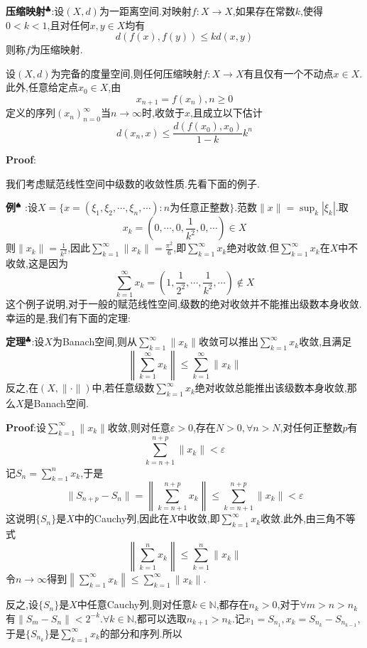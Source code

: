 \textbf{压缩映射}$^\clubsuit $:设$(X,d)$为一距离空间.对映射$f:X\to X$,如果存在常数$k$,使得$0<k<1$,且对任何$x,y\in X$均有
$$
d(f(x),f(y))\leqslant kd(x,y)
$$
则称$f$为压缩映射.
\begin{tcolorbox}[colback=KuangNei,colframe=BianKuang,title=\textbf{Banach不动点定理},sharpish corners]
    设$(X,d)$为完备的度量空间,则任何压缩映射$f:X\to X$有且仅有一个不动点$x\in X$.\\
    此外,任意给定点$x_0\in X$,由
    $$
    x_{n+1}=f(x_n),n\geqslant 0
    $$
    定义的序列$(x_n)^{\infty}_{n=0}$当$n\to \infty$时,收敛于$x$,且成立以下估计
    $$
    d(x_n,x)\leqslant \frac{d(f(x_0),x_0)}{1-k}k^n
    $$
\end{tcolorbox}
\textbf{Proof}:\quad \par
我们考虑赋范线性空间中级数的收敛性质.先看下面的例子.\par
\textbf{例}$^\spadesuit$ :设$X=\{x=(\xi_1,\xi_2,\cdots,\xi_n,\cdots):n\text{为任意正整数}\}$.范数$\|x\|=\sup_{k}|\xi_k|$.取
$$
x_k=(0,\cdots,0,\frac{1}{k^2},0,\cdots)\in X
$$
则$\|x_k\|=\frac{1}{k^2}$,因此$\sum_{k=1}^{\infty}\|x_k\|=\frac{\pi^2}{6}$,即$\sum_{k=1}^{\infty}x_k$绝对收敛.但$\sum_{k=1}^{\infty}x_k$在$X$中不收敛,这是因为
$$
\sum_{k=1}^{\infty}x_k=\left(1,\frac{1}{2^2},\cdots,\frac{1}{k^2},\cdots\right)\notin X
$$
这个例子说明,对于一般的赋范线性空间,级数的绝对收敛并不能推出级数本身收敛.幸运的是,我们有下面的定理:\par
\textbf{定理}$^\clubsuit $:设$X$为Banach空间,则从$\sum_{k=1}^{\infty}\|x_k\|$收敛可以推出$\sum_{k=1}^{\infty}x_k$收敛,且满足
$$
\left\|\sum_{k=1}^{\infty}x_k\right\|\leqslant \sum_{k=1}^{\infty}\|x_k\|
$$
反之,在$(X,\|\cdot\|)$中,若任意级数$\sum_{k=1}^{\infty}x_k$绝对收敛总能推出该级数本身收敛,那么$X$是Banach空间.\par
\textbf{Proof}:设$\sum_{k=1}^{\infty}\|x_k\|$收敛,则对任意$\varepsilon>0$,存在$N>0,\forall n>N$,对任何正整数$p$有
$$
\sum_{k=n+1}^{n+p}\|x_k\|<\varepsilon
$$
记$S_n=\sum_{k=1}^n x_k$,于是
$$
\|S_{n+p}-S_n\|=\left\|\sum_{k=n+1}^{n+p}x_k\right\|\leqslant \sum_{k=n+1}^{n+p}\|x_k\|<\varepsilon
$$
这说明$\{S_n\}$是$X$中的Cauchy列,因此在$X$中收敛,即$\sum_{k=1}^{\infty}x_k$收敛.此外,由三角不等式
$$
\left\|\sum_{k=1}^{n}x_k\right\|\leqslant \sum_{k=1}^{n}\|x_k\|
$$
令$n\to\infty$得到$\left\|\sum_{k=1}^{\infty}x_k\right\|\leqslant \sum_{k=1}^{\infty}\|x_k\|$.\par
反之,设$\{S_n\}$是$X$中任意Cauchy列,则对任意$k\in\mathbb{N}$,都存在$n_k>0$,对于$\forall m>n>n_k$有$\|S_m-S_n\|<2^{-k}$.$\forall k\in\mathbb{N}$,都可以选取$n_{k+1}>n_k$.记$x_1=S_{n_1},x_k=S_{n_k}-S_{n_{k-1}}$,于是$\{S_{n_k}\}$是$\sum_{k=1}^{\infty}x_k$的部分和序列.所以
